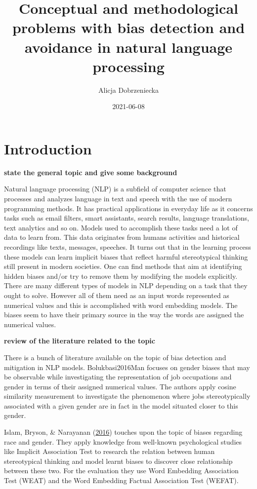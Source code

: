 \documentclass[12pt,]{book}
\title{Conceptual and methodological problems with bias detection and avoidance in natural language processing}
\author{Alicja Dobrzeniecka}
\date{2021-06-08}
\begin{document}
\maketitle

{
\setcounter{tocdepth}{5}
\tableofcontents
}
\chapter{Introduction}\label{introduction}

\textbf{state the general topic and give some background}

Natural language processing (NLP) is a subfield of computer science that
processes and analyzes language in text and speech with the use of
modern programming methods. It has practical applications in everyday
life as it concerns tasks such as email filters, smart assistants,
search results, language translations, text analytics and so on. Models
used to accomplish these tasks need a lot of data to learn from. This
data originates from humans activities and historical recordings like
texts, messages, speeches. It turns out that in the learning process
these models can learn implicit biases that reflect harmful
stereotypical thinking still present in modern societies. One can find
methods that aim at identifying hidden biases and/or try to remove them
by modifying the models explicitly. There are many different types of
models in NLP depending on a task that they ought to solve. However all
of them need as an input words represented as numerical values and this
is accomplished with word embedding models. The biases seem to have
their primary source in the way the words are assigned the numerical
values. \newline

\textbf{review of the literature related to the topic}

There is a bunch of literature available on the topic of bias detection
and mitigation in NLP models. Bolukbasi2016Man focuses on gender biases
that may be observable while investigating the representation of job
occupations and gender in terms of their assigned numerical values. The
authors apply cosine similarity measurement to investigate the
phenomenon where jobs stereotypically associated with a given gender are
in fact in the model situated closer to this gender.

Islam, Bryson, \& Narayanan
(\protect\hyperlink{ref-Caliskan2017Semantics}{2016}) touches upon the
topic of biases regarding race and gender. They apply knowledge from
well-known psychological studies like Implicit Association Test to
research the relation between human stereotypical thinking and model
learnt biases to discover close relationship between these two. For the
evaluation they use Word Embedding Association Test (WEAT) and the Word
Embedding Factual Association Test (WEFAT).
\end{document}
